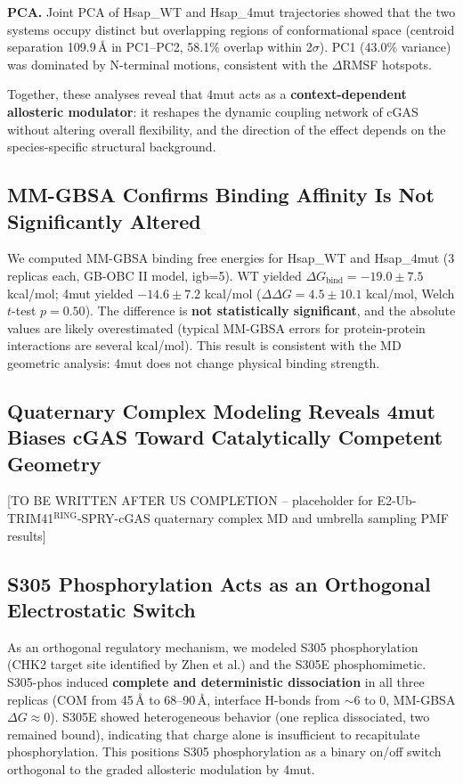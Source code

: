 \documentclass[journal=jcisd8, manuscript=article]{achemso}
\begin{document}
\textbf{PCA.} Joint PCA of Hsap\_WT and Hsap\_4mut trajectories showed that the two systems occupy distinct but overlapping regions of conformational space (centroid separation 109.9\,\AA{} in PC1--PC2, 58.1\% overlap within 2$\sigma$). PC1 (43.0\% variance) was dominated by N-terminal motions, consistent with the $\Delta$RMSF hotspots.

Together, these analyses reveal that 4mut acts as a \textbf{context-dependent allosteric modulator}: it reshapes the dynamic coupling network of cGAS without altering overall flexibility, and the direction of the effect depends on the species-specific structural background.

\subsection{MM-GBSA Confirms Binding Affinity Is Not Significantly Altered}

We computed MM-GBSA binding free energies for Hsap\_WT and Hsap\_4mut (3 replicas each, GB-OBC II model, igb=5). WT yielded $\Delta G_{\text{bind}} = -19.0 \pm 7.5$ kcal/mol; 4mut yielded $-14.6 \pm 7.2$ kcal/mol ($\Delta\Delta G = 4.5 \pm 10.1$ kcal/mol, Welch $t$-test $p = 0.50$). The difference is \textbf{not statistically significant}, and the absolute values are likely overestimated (typical MM-GBSA errors for protein-protein interactions are several kcal/mol).\cite{genheden2015} This result is consistent with the MD geometric analysis: 4mut does not change physical binding strength.

\subsection{Quaternary Complex Modeling Reveals 4mut Biases cGAS Toward Catalytically Competent Geometry}

[TO BE WRITTEN AFTER US COMPLETION -- placeholder for E2-Ub-TRIM41$^{\text{RING}}$-SPRY-cGAS quaternary complex MD and umbrella sampling PMF results]

\subsection{S305 Phosphorylation Acts as an Orthogonal Electrostatic Switch}

As an orthogonal regulatory mechanism, we modeled S305 phosphorylation (CHK2 target site identified by Zhen et al.) and the S305E phosphomimetic. S305-phos induced \textbf{complete and deterministic dissociation} in all three replicas (COM from 45\,\AA{} to 68--90\,\AA, interface H-bonds from $\sim$6 to 0, MM-GBSA $\Delta G \approx 0$). S305E showed heterogeneous behavior (one replica dissociated, two remained bound), indicating that charge alone is insufficient to recapitulate phosphorylation. This positions S305 phosphorylation as a binary on/off switch orthogonal to the graded allosteric modulation by 4mut.
\end{document}
